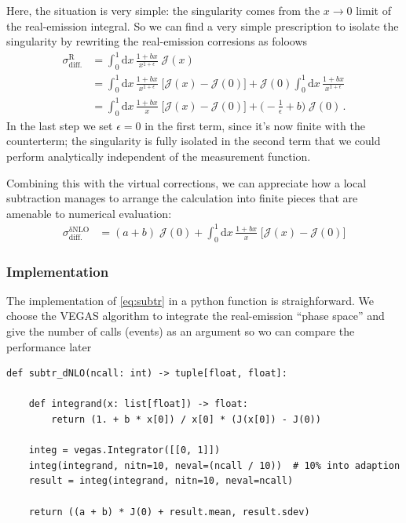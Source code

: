 \documentclass[11pt]{article}
\begin{document}
Here, the situation is very simple: the singularity comes from the \(x\to0\) limit of the real-emission integral.
So we can find a very simple prescription to isolate the singularity by rewriting the real-emission corresions as foloows
\begin{align}
  \sigma^\mathrm{R}_\mathrm{diff.}
  &=
  \int_0^1\mathrm{d}x\,\frac{1+bx}{x^{1+\epsilon}}
  \;\mathcal{J}(x)
  \nonumber\\&=
  \int_0^1\mathrm{d}x\,\frac{1+bx}{x^{1+\epsilon}}
  \;\Big[\mathcal{J}(x) - \mathcal{J}(0)\Bigr]
  + \mathcal{J}(0)
  \int_0^1\mathrm{d}x\,\frac{1+bx}{x^{1+\epsilon}}
  \nonumber\\&=
  \int_0^1\mathrm{d}x\,\frac{1+bx}{x}
  \;\Big[\mathcal{J}(x) - \mathcal{J}(0)\bigr]
  +\biggl( -\frac{1}{\epsilon} + b \biggr) \;\mathcal{J}(0)
  \,.
\end{align}
In the last step we set \(\epsilon=0\) in the first term, since it's now finite with the counterterm; the singularity is fully isolated in the second term that we could perform analytically independent of the measurement function.

Combining this with the virtual corrections, we can appreciate how a local subtraction manages to arrange the calculation into finite pieces that are amenable to numerical evaluation:
\begin{align}
\label{eq:subtr}
  \sigma^\mathrm{\delta NLO}_\mathrm{diff.}
  &=
  (a + b) \;\mathcal{J}(0)
  +\int_0^1\mathrm{d}x\,\frac{1+bx}{x}
  \;\Big[\mathcal{J}(x) - \mathcal{J}(0)\Bigr]
\end{align}

\subsubsection{Implementation}
\label{sec:org639f10b}
The implementation of \eqref{eq:subtr} in a python function is straighforward.
We choose the VEGAS algorithm to integrate the real-emission ``phase space'' and give the number of calls (events) as an argument so wo can compare the performance later
\begin{verbatim}
def subtr_dNLO(ncall: int) -> tuple[float, float]:

    def integrand(x: list[float]) -> float:
        return (1. + b * x[0]) / x[0] * (J(x[0]) - J(0))

    integ = vegas.Integrator([[0, 1]])
    integ(integrand, nitn=10, neval=(ncall / 10))  # 10% into adaption
    result = integ(integrand, nitn=10, neval=ncall)

    return ((a + b) * J(0) + result.mean, result.sdev)
\end{verbatim}
\end{document}
